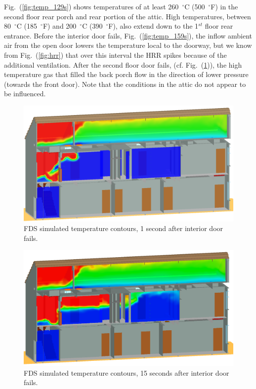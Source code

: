 \documentclass[11pt,oneside]{book}
\begin{document}
Fig.~(\ref{fig:temp_129s}) shows temperatures of at least 260~$^{\circ}$C (500~$^{\circ}$F) in the second floor rear porch and rear portion of the attic. High temperatures, between 80~$^{\circ}$C (185~$^{\circ}$F) and 200~$^{\circ}$C (390~$^{\circ}$F), also extend down to the 1$^{st}$ floor rear entrance. Before the interior door fails, Fig.~(\ref{fig:temp_159s}), the inflow ambient air from the open door lowers the temperature local to the doorway, but we know from Fig.~(\ref{fig:hrr}) that over this interval the HRR spikes because of the additional ventilation. After the second floor door fails, (cf. Fig.~(\ref{fig:temp_161s})), the high temperature gas that filled the back porch flow in the direction of lower pressure (towards the front door). Note that the conditions in the attic do not appear to be influenced.
\begin{figure}[!ht]
\includegraphics[width=.675\textwidth]{../Figures/west_50th_baseline_161}
 

\caption{FDS simulated temperature contours, 1 second after interior door fails.}
\label{fig:temp_161s}
\end{figure}

\begin{figure}[!ht]
\includegraphics[width=.675\textwidth]{../Figures/west_50th_baseline_175}
 

\caption{FDS simulated temperature contours, 15 seconds after interior door fails.}
\label{fig:temp_175s}
\end{figure}
\end{document}
